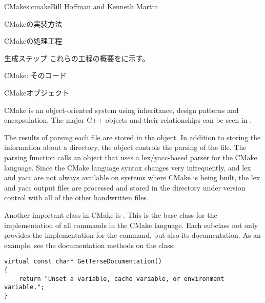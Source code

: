 \begin{aosachapter}{CMake}{s:cmake}{Bill Hoffman and Kenneth Martin}
\begin{aosasect1}{CMakeの実装方法}
\begin{aosasect2}{CMakeの処理工程}
\begin{aosasect3}{生成ステップ}
これらの工程の概要をに示す。


\end{aosasect3}

\end{aosasect2}

\begin{aosasect2}{CMake: そのコード}

\begin{aosasect3}{CMakeオブジェクト}

CMake is an object-oriented system using inheritance, design patterns
and encapsulation.  The major C++ objects and their relationships can
be seen in .


The results of parsing each  file are stored in
the  object. In addition to storing the information
about a directory, the  object controls the parsing
of the  file. The parsing function calls an
object that uses a lex/yacc-based parser for the CMake language.
Since the CMake language syntax changes very infrequently, and lex and yacc
are not always available on systems where CMake is being built, the
lex and yacc output files are processed and stored in the
 directory under version control with all of the other
handwritten files.

Another important class in CMake is . This is the base
class for the implementation of all commands in the CMake
language. Each subclass not only provides the implementation for the
command, but also its documentation. As an example, see the
documentation methods on the  class:

\pagebreak

\begin{verbatim}
virtual const char* GetTerseDocumentation()
{
    return "Unset a variable, cache variable, or environment variable.";
}


\end{verbatim}
\end{aosasect3}
\end{aosasect2}
\end{aosasect1}
\end{aosachapter}
